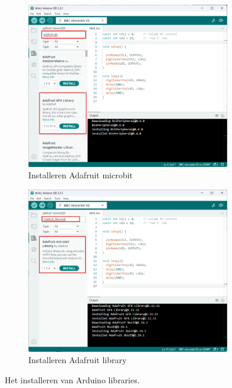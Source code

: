 \begin{enumerate}
\begin{figure}[h!]
\begin{center}
\begin{subfigure}[b]{0.31\textwidth}
			\end{subfigure}
			\begin{subfigure}[b]{0.33\textwidth}
				\includegraphics[width=0.98\textwidth]{figuren/arduinoLibAdafruit}
				\caption{Installeren Adafruit microbit }
				\label{fig:ardlibAdaf}
			\end{subfigure}
			\begin{subfigure}[b]{0.33\textwidth}
	\includegraphics[width=0.98\textwidth]{figuren/arduinoLibAdamico}
	\caption{Installeren Adafruit library }
	\label{fig:ardlibMicro}
\end{subfigure}			
			\captionsetup{justification=centering}
			\caption{Het installeren van Arduino libraries. }
			\label{fig:ardInstal}
		\end{center}
		
	\end{figure}
	
	
\end{enumerate}
